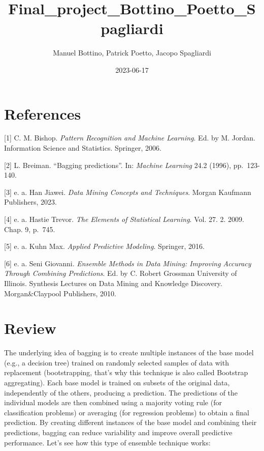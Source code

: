 \documentclass[
]{article}
\title{Final\_project\_Bottino\_Poetto\_Spagliardi}
\author{Manuel Bottino, Patrick Poetto, Jacopo Spagliardi}
\date{2023-06-17}
\begin{document}
\maketitle

{
\hypersetup{linkcolor=}
\setcounter{tocdepth}{2}
\tableofcontents
}
\hypertarget{references}{%
\section{References}\label{references}}

{[}1{]} C. M. Bishop. \emph{Pattern Recognition and Machine Learning}.
Ed. by M. Jordan. Information Science and Statistics. Springer, 2006.

{[}2{]} L. Breiman. ``Bagging predictions''. In: \emph{Machine Learning}
24.2 (1996), pp.~123-140.

{[}3{]} e. a. Han Jiawei. \emph{Data Mining Concepts and Techniques}.
Morgan Kaufmann Publishers, 2023.

{[}4{]} e. a. Hastie Trevor. \emph{The Elements of Statistical
Learning}. Vol. 27. 2. 2009. Chap. 9, p.~745.

{[}5{]} e. a. Kuhn Max. \emph{Applied Predictive Modeling}. Springer,
2016.

{[}6{]} e. a. Seni Giovanni. \emph{Ensemble Methods in Data Mining:
Improving Accuracy Through Combining Predictions}. Ed. by C. Robert
Grossman University of Illinois. Synthesis Lectures on Data Mining and
Knowledge Discovery. Morgan\&Claypool Publishers, 2010.

\newpage

\hypertarget{review}{%
\section{Review}\label{review}}

The underlying idea of bagging is to create multiple instances of the
base model (e.g., a decision tree) trained on randomly selected samples
of data with replacement (bootstrapping, that's why this technique is
also called Bootstrap aggregating). Each base model is trained on
subsets of the original data, independently of the others, producing a
prediction. The predictions of the individual models are then combined
using a majority voting rule (for classification problems) or averaging
(for regression problems) to obtain a final prediction. By creating
different instances of the base model and combining their predictions,
bagging can reduce variability and improve overall predictive
performance. Let's see how this type of ensemble technique works:
\end{document}
